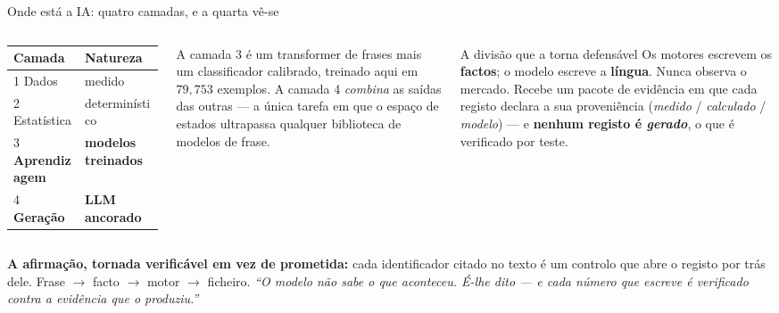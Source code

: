 \documentclass[aspectratio=169]{beamer}
\begin{document}
\begin{frame}{Onde está a IA: quatro camadas, e a quarta vê-se}
\begin{columns}[T]
\small
\begin{tabular}{@{}ll@{}}
\toprule
\textbf{Camada} & \textbf{Natureza} \\
\midrule
1 Dados & medido \\
2 Estatística & determinístico \\
3 \textbf{Aprendizagem} & \textbf{modelos treinados} \\
4 \textbf{Geração} & \textbf{LLM ancorado} \\
\bottomrule
\end{tabular}
\medskip

{\footnotesize A camada 3 é um transformer de frases mais um classificador calibrado, treinado
aqui em $79{,}753$ exemplos. A camada 4 \emph{combina} as saídas das outras --- a única tarefa em
que o espaço de estados ultrapassa qualquer biblioteca de modelos de frase.}

\begin{block}{\small A divisão que a torna defensável}
\small Os motores escrevem os \textbf{factos}; o modelo escreve a \textbf{língua}. Nunca observa o
mercado. Recebe um pacote de evidência em que cada registo declara a sua proveniência
(\emph{medido} / \emph{calculado} / \emph{modelo}) --- e \textbf{nenhum registo é
\emph{gerado}}, o que é verificado por teste.
\end{block}
\end{columns}
\vfill
{\footnotesize\textbf{A afirmação, tornada verificável em vez de prometida:} cada identificador
citado no texto é um controlo que abre o registo por trás dele. Frase $\to$ facto $\to$ motor
$\to$ ficheiro. \emph{``O modelo não sabe o que aconteceu. É-lhe dito --- e cada número que
escreve é verificado contra a evidência que o produziu.''}}
\end{frame}
\end{document}
